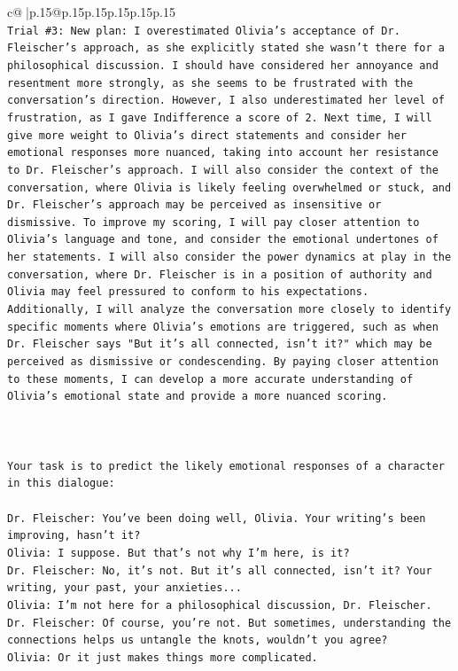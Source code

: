 \documentclass{article}
\begin{document}
{\begin{supertabular}{c@{$\;$}|p{.15\linewidth}@{}p{.15\linewidth}p{.15\linewidth}p{.15\linewidth}p{.15\linewidth}p{.15\linewidth}}
{{{\\ 
\texttt{Trial \#3: New plan: I overestimated Olivia's acceptance of Dr. Fleischer's approach, as she explicitly stated she wasn't there for a philosophical discussion. I should have considered her annoyance and resentment more strongly, as she seems to be frustrated with the conversation's direction. However, I also underestimated her level of frustration, as I gave Indifference a score of 2. Next time, I will give more weight to Olivia's direct statements and consider her emotional responses more nuanced, taking into account her resistance to Dr. Fleischer's approach. I will also consider the context of the conversation, where Olivia is likely feeling overwhelmed or stuck, and Dr. Fleischer's approach may be perceived as insensitive or dismissive. To improve my scoring, I will pay closer attention to Olivia's language and tone, and consider the emotional undertones of her statements. I will also consider the power dynamics at play in the conversation, where Dr. Fleischer is in a position of authority and Olivia may feel pressured to conform to his expectations. Additionally, I will analyze the conversation more closely to identify specific moments where Olivia's emotions are triggered, such as when Dr. Fleischer says "But it's all connected, isn't it?" which may be perceived as dismissive or condescending. By paying closer attention to these moments, I can develop a more accurate understanding of Olivia's emotional state and provide a more nuanced scoring.} \\
\\ 
\\ 
\\ 
\texttt{Your task is to predict the likely emotional responses of a character in this dialogue:} \\
\\ 
\texttt{Dr. Fleischer: You've been doing well, Olivia. Your writing's been improving, hasn't it?} \\
\texttt{Olivia: I suppose. But that's not why I'm here, is it?} \\
\texttt{Dr. Fleischer: No, it's not. But it's all connected, isn't it? Your writing, your past, your anxieties...} \\
\texttt{Olivia: I'm not here for a philosophical discussion, Dr. Fleischer.} \\
\texttt{Dr. Fleischer: Of course, you're not. But sometimes, understanding the connections helps us untangle the knots, wouldn't you agree?} \\
\texttt{Olivia: Or it just makes things more complicated.} \\
}}}
\end{supertabular}}
\end{document}
